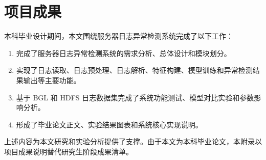\chapter{项目成果}

本科毕业设计期间，本文围绕服务器日志异常检测系统完成了以下工作：

\begin{enumerate}
    \item 完成了服务器日志异常检测系统的需求分析、总体设计和模块划分。
    \item 实现了日志读取、日志预处理、日志解析、特征构建、模型训练和异常检测结果输出等主要功能。
    \item 基于 BGL 和 HDFS 日志数据集完成了系统功能测试、模型对比实验和参数影响分析。
    \item 形成了毕业论文正文、实验结果图表和系统核心实现说明。
\end{enumerate}

上述内容为本文研究和实验分析提供了支撑。由于本文为本科毕业论文，本附录以项目成果说明替代研究生阶段成果清单。
